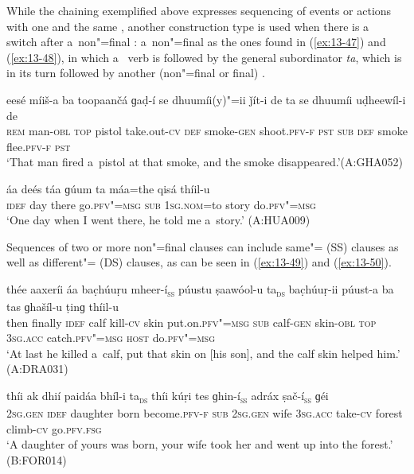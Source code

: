 While the chaining exemplified above expresses sequencing of events or actions with one and the same , another construction type is used when there is a~ switch after a~non"=final : a~non"=final  as the ones found in (\ref{ex:13-47}) and (\ref{ex:13-48}), in which a~ verb is followed by the general subordinator \textit{ta}, which is in its turn followed by another (non"=final or final) .

\begin{exe}
\ex
\label{ex:13-47}
\gll eesé míiš-a ba toopaančá ɡaḍ-í {\ob}se dhuumíi(y)"=ii ǰít-i de ta{\cb} se dhuumíi uḍheewíl-i de \\
\textsc{rem} man-\textsc{obl} \textsc{top} pistol take.out-\textsc{cv} \textsc{def}  smoke-\textsc{gen} shoot.\textsc{pfv-f} \textsc{pst} \textsc{sub} \textsc{def} smoke flee.\textsc{pfv-f} \textsc{pst} \\
\glt `That man fired a~pistol at that smoke, and the smoke disappeared.'\newline (A:GHA052)

\ex
\label{ex:13-48}
\gll {\ob}áa deés táa ɡúum ta{\cb} máa=the qisá thíil-u \\
\textsc{idef} day there go.\textsc{pfv"=msg } \textsc{sub} \textsc{1sg.nom}=to story do.\textsc{pfv"=msg}  \\
\glt `One day when I went there, he told me a~story.' (A:HUA009) 
\end{exe}

Sequences of two or more non"=final clauses can include same"= (SS) clauses as well as different"= (DS) clauses, as can be seen in (\ref{ex:13-49}) and (\ref{ex:13-50}).

\ea
\label{ex:13-49}
\gll thée aaxeríi {\ob}áa bac̣húuṛu mheer-í{\cb}\textsc{\textsubscript{\upshape ss}} {\ob}púustu ṣaawóol-u ta{\cb}\textsc{\textsubscript{\upshape ds}} bac̣húuṛ-ii púust-a ba tas ɡhašíl-u ṭinɡ thíil-u \\
then finally \textsc{idef} calf kill-\textsc{cv}  skin  put.on.\textsc{pfv"=msg} \textsc{sub} calf-\textsc{gen} skin-\textsc{obl} \textsc{top} \textsc{3sg.acc}
catch.\textsc{pfv"=msg} \textsc{host} do.\textsc{pfv"=msg} \\
\glt `At last he killed a~calf, put that skin on [his son], and the calf skin helped him.' (A:DRA031)

\ex
\label{ex:13-50}
\gll {\ob}thíi ak dhií paidáa bhíl-i ta{\cb}\textsc{\textsubscript{\upshape ds}} {\ob}thíi kúṛi tes ɡhin-í{\cb}\textsc{\textsubscript{\upshape ss}} {\ob}adráx ṣač-í{\cb}\textsc{\textsubscript{\upshape ss}} ɡéi \\
\textsc{2sg.gen} \textsc{idef} daughter born become.\textsc{pfv-f} \textsc{sub} \textsc{2sg.gen}  wife \textsc{3sg.acc} take-\textsc{cv} forest climb-\textsc{cv} go.\textsc{pfv.fsg} \\
\glt `A daughter of yours was born, your wife took her and went up into the forest.' (B:FOR014) 
\z

